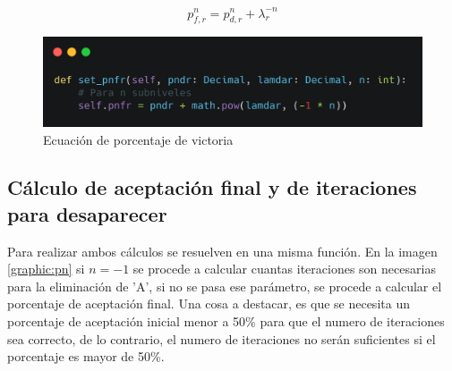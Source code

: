 \begin{equation}
    p_{f,r}^n = p_{d,r}^n + \lambda_r^{-n}
\end{equation}

\begin{figure}[!htb]
    \centering
    \includegraphics[scale=.15]{TT/img/pruebas/pnfr.png}
    \caption{Ecuación de porcentaje de victoria}
    \label{graphic:pnfr}
\end{figure}

\subsection{Cálculo de aceptación final y de iteraciones para desaparecer}

Para realizar ambos cálculos se resuelven en una misma función. En la imagen \ref{graphic:pn} si $n = -1$ se procede a calcular cuantas iteraciones son necesarias para la eliminación de 'A', si no se pasa ese parámetro, se procede a calcular el porcentaje de aceptación final. Una cosa a destacar, es que se necesita un porcentaje de aceptación inicial menor a 50\% para que el numero de iteraciones sea correcto, de lo contrario, el numero de iteraciones no serán suficientes si el porcentaje es mayor de 50\%.

